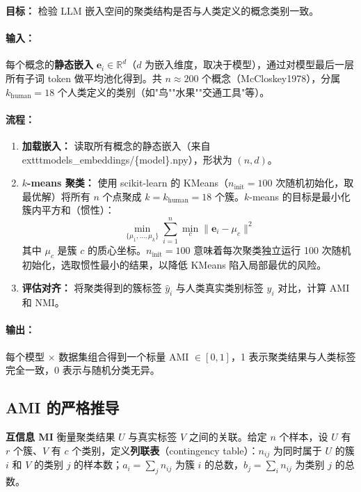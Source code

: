 \documentclass[11pt,a4paper]{article}
\begin{document}
\textbf{目标：} 检验 LLM 嵌入空间的聚类结构是否与人类定义的概念类别一致。

\paragraph{输入：} 每个概念的\textbf{静态嵌入} $\mathbf{e}_i \in \mathbb{R}^d$（$d$ 为嵌入维度，取决于模型），通过对模型最后一层所有子词 token 做平均池化得到。共 $n \approx 200$ 个概念（McCloskey1978），分属 $k_{\text{human}}=18$ 个人类定义的类别（如"鸟""水果""交通工具"等）。

\paragraph{流程：}
\begin{enumerate}[noitemsep]
  \item \textbf{加载嵌入：} 读取所有概念的静态嵌入（来自 	exttt{models\_embeddings/\{model\}.npy}），形状为 $(n, d)$。
  \item \textbf{$k$-means 聚类：} 使用 scikit-learn 的 KMeans（$n_{\text{init}}=100$ 次随机初始化，取最优解）将所有 $n$ 个点聚成 $k=k_{\text{human}}=18$ 个簇。$k$-means 的目标是最小化簇内平方和（惯性）：
  \[
  \min_{\{\mu_1,\dots,\mu_k\}} \sum_{i=1}^{n} \min_{c} \|\mathbf{e}_i - \mu_c\|^2
  \]
  其中 $\mu_c$ 是簇 $c$ 的质心坐标。$n_{\text{init}}=100$ 意味着每次聚类独立运行 100 次随机初始化，选取惯性最小的结果，以降低 KMeans 陷入局部最优的风险。
  \item \textbf{评估对齐：} 将聚类得到的簇标签 $\hat{y}_i$ 与人类真实类别标签 $y_i$ 对比，计算 AMI 和 NMI。
\end{enumerate}

\paragraph{输出：} 每个模型 $\times$ 数据集组合得到一个标量 AMI $\in [0,1]$，1 表示聚类结果与人类标签完全一致，0 表示与随机分类无异。

\subsection{AMI 的严格推导}

\textbf{互信息 MI} 衡量聚类结果 $U$ 与真实标签 $V$ 之间的关联。给定 $n$ 个样本，设 $U$ 有 $r$ 个簇、$V$ 有 $c$ 个类别，定义\textbf{列联表}（contingency table）：$n_{ij}$ 为同时属于 $U$ 的簇 $i$ 和 $V$ 的类别 $j$ 的样本数；$a_i = \sum_j n_{ij}$ 为簇 $i$ 的总数，$b_j = \sum_i n_{ij}$ 为类别 $j$ 的总数。
\end{document}

